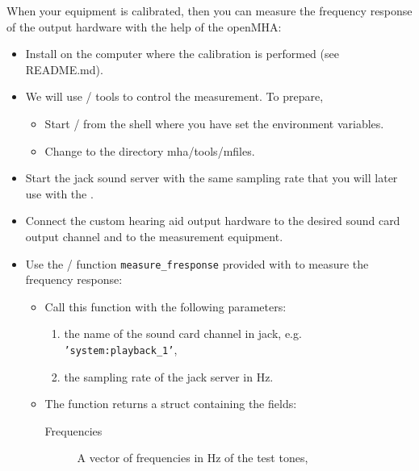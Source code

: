 \documentclass[11pt,a4paper,twoside]{article}
\newcommand{\+}{\discretionary{\mbox{\scriptsize$\hookleftarrow$}}{}{}}
\begin{document}
%

When your equipment is calibrated, then you can measure the frequency
response of the output hardware with the help of the openMHA:

\begin{itemize}
\item
  Install \mha{} on the computer where the calibration is performed (see README.md).
\item
  We will use \Octave{}/\Matlab{} tools to control the measurement. To
  prepare,
  \begin{itemize}
  \item Start \Octave{}/\Matlab{} from the shell where you have set
    the \mha{} environment variables.
  \item Change to the directory mha/tools/mfiles.
  \end{itemize}
\item
  Start the jack sound server with the same sampling rate that you
  will later use with the \mha{}.
\item
  Connect the custom hearing aid output hardware to the desired
  sound card output channel and to the measurement equipment.
\item
  Use the \Octave{}/\Matlab{} function \texttt{measure\_fresponse}
  provided with \mha{} to measure the frequency response:
  \begin{itemize}
  \item Call this function with the following parameters:
    \begin{enumerate}
    \item the name of the sound card channel in jack,
      e.g. \texttt{'system:playback\_1'},
    \item the sampling rate of the jack server in Hz.
    \end{enumerate}
  \item The function returns a struct containing the fields:
    \begin{description}
    \item [Frequencies] A vector of frequencies in Hz of the test tones,

\end{description}
\end{itemize}
\end{itemize}
\end{document}
